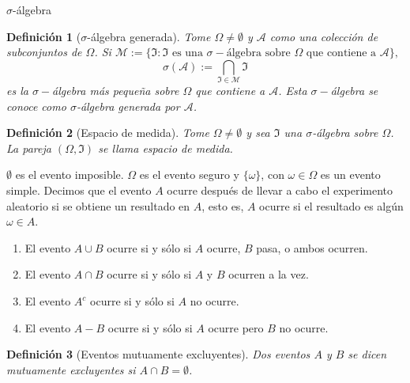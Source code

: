 \documentclass{beamer}
\newtheorem{defi}{Definición}[section]
\begin{document}
\begin{frame}[allowframebreaks]{$\sigma$-álgebra}
	\begin{defi}[$\sigma$-álgebra generada]
		Tome $\Omega\neq\emptyset$ y $\mathcal{A}$ como una colección de subconjuntos de $\Omega$. Si $\mathcal{M}:=\{\Im:\Im\text{ es una }\sigma-\text{álgebra sobre }\Omega \text{ que contiene a } \mathcal{A}\},$
		$$\sigma(\mathcal{A}):=\bigcap_{\Im\in \mathcal{M}}\Im$$
		es la $\sigma-$álgebra más pequeña sobre $\Omega$ que contiene a $\mathcal{A}$. Esta $\sigma-$álgebra se conoce como $\sigma$-álgebra generada por $\mathcal{A}$.
	\end{defi}
	
	\begin{defi}[Espacio de medida]
		Tome $\Omega\neq\emptyset$ y sea $\Im$ una $\sigma$-álgebra sobre $\Omega$. La pareja $(\Omega,\Im)$ se llama espacio de medida.
	\end{defi}
	$\emptyset$ es el evento imposible. $\Omega$ es el evento seguro y $\{\omega\}$, con $\omega\in\Omega$ es un evento simple. Decimos que el evento $A$ ocurre después de llevar a cabo el experimento aleatorio si se obtiene un resultado en $A$, esto es, $A$ ocurre si el resultado es algún $\omega\in A$.
	\begin{enumerate}
		\item El evento $A\cup B$ ocurre si y sólo si $A$ ocurre, $B$ pasa, o ambos ocurren.
		\item El evento $A\cap B$ ocurre si y sólo si $A$ y $B$ ocurren a la vez.
		\item El evento $A^c$ ocurre si y sólo si $A$ no ocurre.
		\item El evento $A-B$ ocurre si y sólo si $A$ ocurre pero $B$ no ocurre.
	\end{enumerate}
	\begin{defi}[Eventos mutuamente excluyentes]
		Dos eventos $A$ y $B$ se dicen mutuamente excluyentes si $A\cap B=\emptyset$.
	\end{defi}
	
	\end{frame}
	
\end{document}
